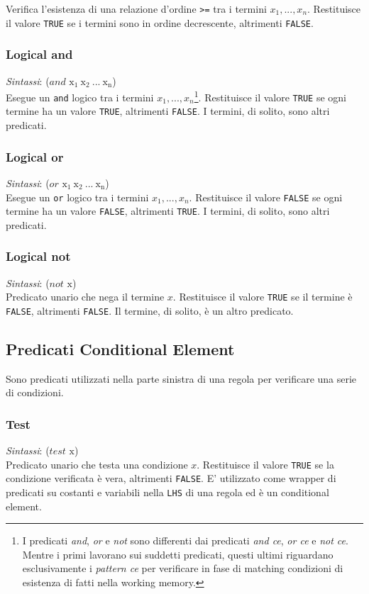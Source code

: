 Verifica l'esistenza di una relazione d'ordine \verb!>=! tra i termini $x_1, ..., x_n$. Restituisce il valore \verb!TRUE! se i termini sono in ordine decrescente, altrimenti \verb!FALSE!.

\subsubsection{Logical and} 
\emph{Sintassi}: ($and$ $\mathrm{x_1 \ x_2 \ ... \ x_n}$)\\

Esegue un \verb!and! logico tra i termini $x_1, ..., x_n$\footnote{I predicati \emph{and}, \emph{or} e \emph{not} sono differenti dai predicati \emph{and ce}, \emph{or ce} e \emph{not ce}. Mentre i primi lavorano sui suddetti predicati, questi ultimi riguardano esclusivamente i \emph{pattern ce} per verificare in fase di matching condizioni di esistenza di fatti nella working memory.}. Restituisce il valore \verb!TRUE! se ogni termine ha un valore \verb!TRUE!, altrimenti \verb!FALSE!. I termini, di solito, sono altri predicati.


\subsubsection{Logical or}
\emph{Sintassi}: ($or$ $\mathrm{x_1 \ x_2 \ ... \ x_n}$)\\

Esegue un \verb!or! logico tra i termini $x_1, ..., x_n$. Restituisce il valore \verb!FALSE! se ogni termine ha un valore \verb!FALSE!, altrimenti \verb!TRUE!. I termini, di solito, sono altri predicati.


\subsubsection{Logical not}
\emph{Sintassi}: ($not$ $\mathrm{x}$)\\

Predicato unario che nega il termine $x$. Restituisce il valore \verb!TRUE! se il termine è \verb!FALSE!, altrimenti \verb!FALSE!. Il termine, di solito, è un altro predicato.

\subsection{Predicati Conditional Element}

Sono predicati utilizzati nella parte sinistra di una regola per verificare una serie di condizioni.

\subsubsection{Test}
\emph{Sintassi}: ($test$ $\mathrm{x}$)\\

Predicato unario che testa una condizione $x$. Restituisce il valore \verb!TRUE! se la condizione verificata è vera, altrimenti \verb!FALSE!. E' utilizzato come wrapper di predicati su costanti e variabili nella \verb!LHS! di una regola ed è un conditional element.


